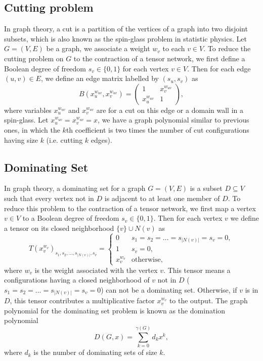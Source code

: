 \documentclass[onefignum, onetabnum]{siamart190516}
\newcommand{\<}{\langle}
\renewcommand{\>}{\rangle}
\begin{document}
\subsection{Cutting problem}
In graph theory, a cut is a partition of the vertices of a graph into two disjoint subsets,
which is also known as the spin-glass problem in statistic physics.
Let $G=(V,E)$ be a graph, we associate a weight $w_v$ to each $v\in V$. To reduce the cutting problem on $G$ to the contraction of a tensor network, we first define a Boolean degree of freedom $s_v\in\{0, 1\}$ for each vertex $v\in V$.
Then for each edge $(u,v)\in E$, we define an edge matrix labelled by $(s_u, s_v)$ as
\begin{equation}
    B(x^{w_{uv}}_u, x^{w_{uv}}_v) = \left(\begin{matrix}
        1 & x_{v}^{w_{uv}}\\
        x_{u}^{w_{uv}} & 1
    \end{matrix}\right),
\end{equation}
where variables $x_u^{w_{uv}}$ and $x_v^{w_{uv}}$ are for a cut on this edge or a domain wall in a spin-glass.
Let $x_u^{w_{uv}} = x_v^{w_{uv}} = x$, we have a graph polynomial similar to previous ones,
in which the $k$th coefficient is two times the number of cut configurations having size $k$ (i.e. cutting $k$ edges).

\subsection{Dominating Set}
In graph theory, a dominating set for a graph $G = (V, E)$ is a subset $D \subseteq V$ such that every vertex not in $D$ is adjacent to at least one member of $D$.
To reduce this problem to the contraction of a tensor network, we first map a vertex $v\in V$ to a Boolean degree of freedom $s_v\in\{0, 1\}$.
Then for each vertex $v$ we define a tensor on its closed neighborhood $\{v\} \cup N(v)$ as
\begin{equation}
T(x^{w_v}_v)_{s_1,s_2,\ldots,s_{|N(v)|},s_v} = \begin{cases}
    0 & s_1=s_2=\ldots=s_{|N(v)|}=s_v=0,\\
    1 & s_v=0,\\
    x^{w_v}_v & \text{otherwise},
\end{cases}
\end{equation}
where $w_v$ is the weight associated with the vertex $v$.
This tensor means a configurations having a closed neighborhood of $v$ not in $D$ ($s_1=s_2=\ldots=s_{|N(v)|}=s_v=0$) can not be a dominating set.
Otherwise, if $v$ is in $D$, this tensor contributes a multiplicative factor $x_v^{w_v}$ to the output.
The graph polynomial for the dominating set problem is known as the domination polynomial~\cite{Alikhani2009}
\begin{equation}
D(G, x) = \sum_{k=0}^{\gamma(G)} d_k x^k,
\end{equation}
where $d_k$ is the number of dominating sets of size $k$.
\end{document}
